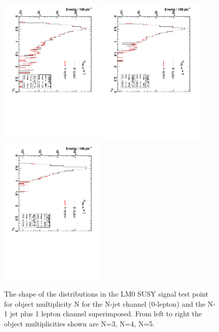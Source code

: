 \begin{figure}
\centering
\includegraphics[width=0.45\textwidth, angle=90]{Figures/AlphaT/aT_3}
\includegraphics[width=0.45\textwidth,angle=90]{Figures/AlphaT/aT_4}
\includegraphics[width=0.45\textwidth,angle=90]{Figures/AlphaT/aT_5}
\caption{\label{fig:aTnobj}The shape of the \alt distributions in the LM0 SUSY signal test point for object multiplicity N for the N-jet channel (0-lepton) and the N-1 jet plus 1 lepton channel superimposed. From left to right the object multiplicities shown are N=3, N=4, N=5.}
\end{figure}

